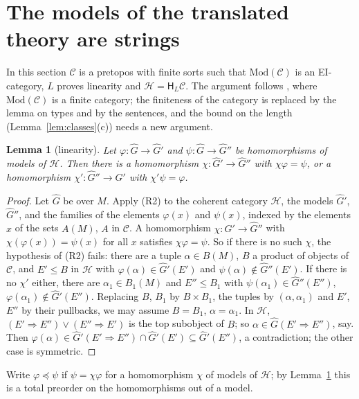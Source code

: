 \documentclass[11pt]{amsart}
\newtheorem{lem}[thm]{Lemma}
\theoremstyle{definition}
\newcommand{\Mod}{\mathrm{Mod}}
\newcommand{\HH}{\mathsf H}
\newcommand{\cC}{\mathcal C}
\newcommand{\cH}{\mathcal H}
\begin{document}
\section{The models of the translated theory are strings}\label{sec:strings}

In this section $\cC$ is a pretopos with finite sorts such that
$\Mod(\cC)$ is an EI-category, $L$ proves linearity and
$\cH=\HH_L\cC$. The argument follows \cite[\S\S3--4]{Strings}, where
$\Mod(\cC)$ is a finite category; the finiteness of the category is
replaced by the lemma on types and by the sentences, and the bound on
the length (Lemma~\ref{lem:classes}(c)) needs a new argument.

\begin{lem}[linearity]\label{lem:lin}
Let $\varphi\colon\hat G\to\hat G'$ and $\psi\colon\hat G\to\hat G''$
be homomorphisms of models of $\cH$. Then there is a homomorphism
$\chi\colon\hat G'\to\hat G''$ with $\chi\varphi=\psi$, or a
homomorphism $\chi'\colon\hat G''\to\hat G'$ with $\chi'\psi=\varphi$.
\end{lem}
\begin{proof}
Let $\hat G$ be over $M$. Apply (R2) to the coherent category $\cH$,
the models $\hat G'$, $\hat G''$, and the families of the elements
$\varphi(x)$ and $\psi(x)$, indexed by the elements $x$ of the sets
$A(M)$, $A$ in $\cC$. A homomorphism $\chi\colon\hat G'\to\hat G''$
with $\chi(\varphi(x))=\psi(x)$ for all $x$ satisfies $\chi\varphi=
\psi$. So if there is no such $\chi$, the hypothesis of (R2) fails:
there are a tuple $\alpha\in B(M)$, $B$ a product of objects of $\cC$,
and $E'\le B$ in $\cH$ with $\varphi(\alpha)\in\hat G'(E')$ and
$\psi(\alpha)\notin\hat G''(E')$. If there is no $\chi'$ either, there
are $\alpha_1\in B_1(M)$ and $E''\le B_1$ with $\psi(\alpha_1)\in\hat
G''(E'')$, $\varphi(\alpha_1)\notin\hat G'(E'')$. Replacing $B$, $B_1$
by $B\times B_1$, the tuples by $(\alpha,\alpha_1)$ and $E'$, $E''$ by
their pullbacks, we may assume $B=B_1$, $\alpha=\alpha_1$. In $\cH$,
$(E'\Rightarrow E'')\vee(E''\Rightarrow E')$ is the top subobject of
$B$; so $\alpha\in\hat G(E'\Rightarrow E'')$, say. Then
$\varphi(\alpha)\in\hat G'(E'\Rightarrow E'')\cap\hat G'(E')\subseteq
\hat G'(E'')$, a contradiction; the other case is symmetric.
\end{proof}

Write $\varphi\preceq\psi$ if $\psi=\chi\varphi$ for a homomorphism
$\chi$ of models of $\cH$; by Lemma~\ref{lem:lin} this is a total
preorder on the homomorphisms out of a model.
\end{document}
